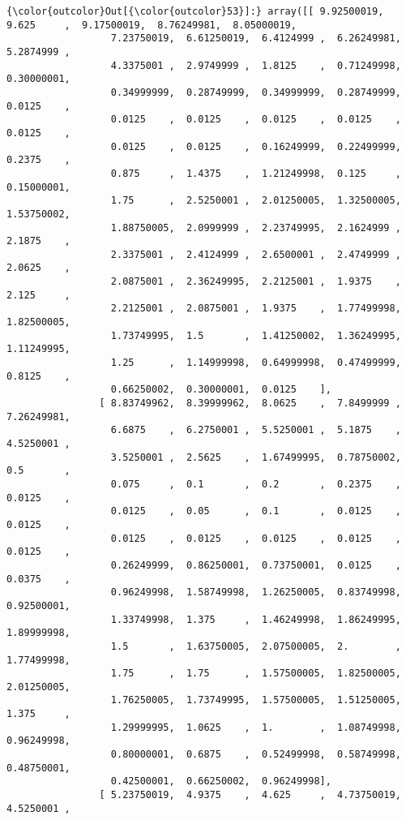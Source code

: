 \documentclass{article}
\begin{document}
            \begin{Verbatim}[commandchars=\\\{\}]
{\color{outcolor}Out[{\color{outcolor}53}]:} array([[ 9.92500019,  9.625     ,  9.17500019,  8.76249981,  8.05000019,
                  7.23750019,  6.61250019,  6.4124999 ,  6.26249981,  5.2874999 ,
                  4.3375001 ,  2.9749999 ,  1.8125    ,  0.71249998,  0.30000001,
                  0.34999999,  0.28749999,  0.34999999,  0.28749999,  0.0125    ,
                  0.0125    ,  0.0125    ,  0.0125    ,  0.0125    ,  0.0125    ,
                  0.0125    ,  0.0125    ,  0.16249999,  0.22499999,  0.2375    ,
                  0.875     ,  1.4375    ,  1.21249998,  0.125     ,  0.15000001,
                  1.75      ,  2.5250001 ,  2.01250005,  1.32500005,  1.53750002,
                  1.88750005,  2.0999999 ,  2.23749995,  2.1624999 ,  2.1875    ,
                  2.3375001 ,  2.4124999 ,  2.6500001 ,  2.4749999 ,  2.0625    ,
                  2.0875001 ,  2.36249995,  2.2125001 ,  1.9375    ,  2.125     ,
                  2.2125001 ,  2.0875001 ,  1.9375    ,  1.77499998,  1.82500005,
                  1.73749995,  1.5       ,  1.41250002,  1.36249995,  1.11249995,
                  1.25      ,  1.14999998,  0.64999998,  0.47499999,  0.8125    ,
                  0.66250002,  0.30000001,  0.0125    ],
                [ 8.83749962,  8.39999962,  8.0625    ,  7.8499999 ,  7.26249981,
                  6.6875    ,  6.2750001 ,  5.5250001 ,  5.1875    ,  4.5250001 ,
                  3.5250001 ,  2.5625    ,  1.67499995,  0.78750002,  0.5       ,
                  0.075     ,  0.1       ,  0.2       ,  0.2375    ,  0.0125    ,
                  0.0125    ,  0.05      ,  0.1       ,  0.0125    ,  0.0125    ,
                  0.0125    ,  0.0125    ,  0.0125    ,  0.0125    ,  0.0125    ,
                  0.26249999,  0.86250001,  0.73750001,  0.0125    ,  0.0375    ,
                  0.96249998,  1.58749998,  1.26250005,  0.83749998,  0.92500001,
                  1.33749998,  1.375     ,  1.46249998,  1.86249995,  1.89999998,
                  1.5       ,  1.63750005,  2.07500005,  2.        ,  1.77499998,
                  1.75      ,  1.75      ,  1.57500005,  1.82500005,  2.01250005,
                  1.76250005,  1.73749995,  1.57500005,  1.51250005,  1.375     ,
                  1.29999995,  1.0625    ,  1.        ,  1.08749998,  0.96249998,
                  0.80000001,  0.6875    ,  0.52499998,  0.58749998,  0.48750001,
                  0.42500001,  0.66250002,  0.96249998],
                [ 5.23750019,  4.9375    ,  4.625     ,  4.73750019,  4.5250001 ,

\end{Verbatim}
\end{document}
